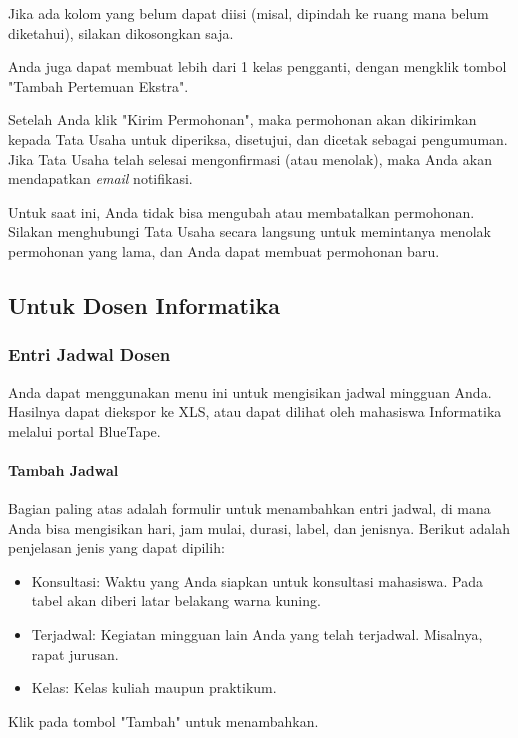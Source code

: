 Jika ada kolom yang belum dapat diisi (misal, dipindah ke ruang mana belum diketahui), silakan dikosongkan saja.

Anda juga dapat membuat lebih dari 1 kelas pengganti, dengan mengklik tombol "Tambah Pertemuan Ekstra".

Setelah Anda klik "Kirim Permohonan", maka permohonan akan dikirimkan kepada Tata Usaha untuk diperiksa, disetujui, dan dicetak sebagai pengumuman. Jika Tata Usaha telah selesai mengonfirmasi (atau menolak), maka Anda akan mendapatkan \textit{email} notifikasi.

Untuk saat ini, Anda tidak bisa mengubah atau membatalkan permohonan. Silakan menghubungi Tata Usaha secara langsung untuk memintanya menolak permohonan yang lama, dan Anda dapat membuat permohonan baru.

\subsection{Untuk Dosen Informatika}
\label{sec:bluetape_dosen_informatika}

\subsubsection{Entri Jadwal Dosen}
\label{sec:bluetape_entri_jadwal_dosen}
Anda dapat menggunakan menu ini untuk mengisikan jadwal mingguan Anda. Hasilnya dapat diekspor ke XLS, atau dapat dilihat oleh mahasiswa Informatika melalui portal BlueTape.

\paragraph{Tambah Jadwal}
\label{sec:bluetape_tambah_jadwal}
Bagian paling atas adalah formulir untuk menambahkan entri jadwal, di mana Anda bisa mengisikan hari, jam mulai, durasi, label, dan jenisnya. Berikut adalah penjelasan jenis yang dapat dipilih:
\begin{itemize}
	\item Konsultasi: Waktu yang Anda siapkan untuk konsultasi mahasiswa. Pada tabel akan diberi latar belakang warna kuning.
	\item Terjadwal: Kegiatan mingguan lain Anda yang telah terjadwal. Misalnya, rapat jurusan.
	\item Kelas: Kelas kuliah maupun praktikum.
\end{itemize}

Klik pada tombol "Tambah" untuk menambahkan.

